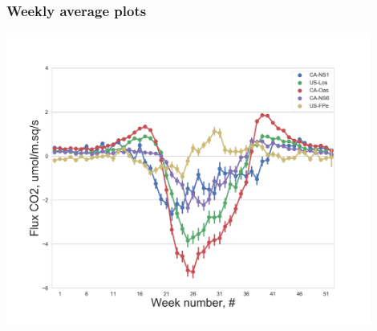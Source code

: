 \documentclass{beamer}
\begin{document}



\begin{frame}
\frametitle{Weekly average plots}
\centering
\includegraphics[width=0.9\textwidth]{FvsW_mean/all.png}\\
\end{frame}
\end{document}
